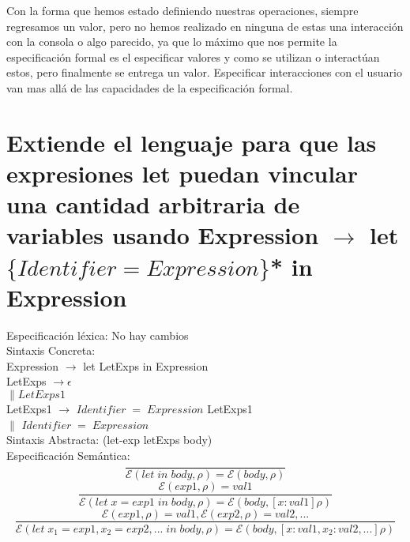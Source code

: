 \documentclass{article}
\begin{document}
Con la forma que hemos estado definiendo nuestras operaciones, siempre regresamos un valor, pero no hemos realizado en ninguna de estas una interacción con la consola o algo parecido, ya que lo máximo que nos permite la especificación formal es el especificar valores y como se utilizan o interactúan estos, pero finalmente se entrega un valor. Especificar interacciones con el usuario van mas allá de las capacidades de la especificación formal.
\\

\section{Extiende el lenguaje para que las expresiones let puedan vincular una cantidad arbitraria
de variables usando Expression $\rightarrow$ let $\{Identifier = Expression\}$* in Expression}
Especificación léxica: No hay cambios
\\
Sintaxis Concreta:
\\
Expression $\rightarrow$ let LetExps in Expression 
\\
LetExps $\rightarrow \epsilon$
\\
$\|LetExps1$
\\
LetExps1 $\rightarrow$ $Identifier\; = \;Expression$ LetExps1
\\
$\|$ $Identifier\; = \;Expression$ 
\\
Sintaxis Abstracta:
(let-exp letExps body)
\\
Especificación Semántica:
$$\frac{}{\mathcal{E} (let\; in\; body, \rho ) = \mathcal{E} (body,\rho)}$$
$$\frac{\mathcal{E} (exp1, \rho) = val1}{\mathcal{E} (let\; x = exp1\; in\; body, \rho ) = \mathcal{E} (body,[x : val1]\rho)}$$
$$\frac{\mathcal{E} (exp1, \rho) = val1, \mathcal{E} (exp2, \rho) = val2, ...}{\mathcal{E} (let\; x_1 = exp1, x_2 = exp2, ...\; in\; body, \rho ) = \mathcal{E} (body,[x : val1, x_2 : val2, ...]\rho)}$$
\\

\end{document}
